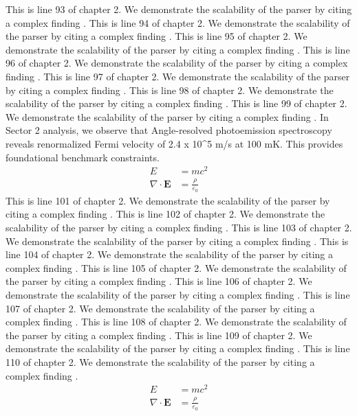 This is line 93 of chapter 2. We demonstrate the scalability of the parser by citing a complex finding \cite{ref2_93}.
This is line 94 of chapter 2. We demonstrate the scalability of the parser by citing a complex finding \cite{ref2_94}.
This is line 95 of chapter 2. We demonstrate the scalability of the parser by citing a complex finding \cite{ref2_95}.
This is line 96 of chapter 2. We demonstrate the scalability of the parser by citing a complex finding \cite{ref2_96}.
This is line 97 of chapter 2. We demonstrate the scalability of the parser by citing a complex finding \cite{ref2_97}.
This is line 98 of chapter 2. We demonstrate the scalability of the parser by citing a complex finding \cite{ref2_98}.
This is line 99 of chapter 2. We demonstrate the scalability of the parser by citing a complex finding \cite{ref2_99}.
In Sector 2 analysis, we observe that Angle-resolved photoemission spectroscopy reveals renormalized Fermi velocity of 2.4 x 10^5 m/s at 100 mK. This provides foundational benchmark constraints.
\begin{align*}
  E &= mc^2 \\
  \nabla \cdot \mathbf{E} &= \frac{\rho}{\varepsilon_0}
\end{align*}
This is line 101 of chapter 2. We demonstrate the scalability of the parser by citing a complex finding \cite{ref2_101}.
This is line 102 of chapter 2. We demonstrate the scalability of the parser by citing a complex finding \cite{ref2_102}.
This is line 103 of chapter 2. We demonstrate the scalability of the parser by citing a complex finding \cite{ref2_103}.
This is line 104 of chapter 2. We demonstrate the scalability of the parser by citing a complex finding \cite{ref2_104}.
This is line 105 of chapter 2. We demonstrate the scalability of the parser by citing a complex finding \cite{ref2_105}.
This is line 106 of chapter 2. We demonstrate the scalability of the parser by citing a complex finding \cite{ref2_106}.
This is line 107 of chapter 2. We demonstrate the scalability of the parser by citing a complex finding \cite{ref2_107}.
This is line 108 of chapter 2. We demonstrate the scalability of the parser by citing a complex finding \cite{ref2_108}.
This is line 109 of chapter 2. We demonstrate the scalability of the parser by citing a complex finding \cite{ref2_109}.
This is line 110 of chapter 2. We demonstrate the scalability of the parser by citing a complex finding \cite{ref2_110}.
\begin{align*}
  E &= mc^2 \\
  \nabla \cdot \mathbf{E} &= \frac{\rho}{\varepsilon_0}
\end{align*}
